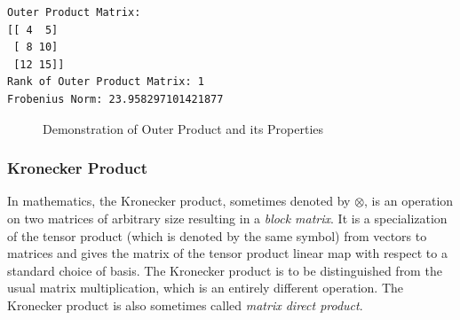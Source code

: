 \documentclass[
  letterpaper,
  DIV=11,
  numbers=noendperiod]{scrreprt}
\theoremstyle{plain}
\theoremstyle{definition}
\theoremstyle{remark}
\begin{document}
\begin{verbatim}
Outer Product Matrix:
[[ 4  5]
 [ 8 10]
 [12 15]]
Rank of Outer Product Matrix: 1
Frobenius Norm: 23.958297101421877
\end{verbatim}

\begin{figure}[H]


\caption{\label{fig-op}Demonstration of Outer Product and its
Properties}

\end{figure}%

\subsubsection{Kronecker Product}\label{kronecker-product}

In mathematics, the Kronecker product, sometimes denoted by \(\otimes\),
is an operation on two matrices of arbitrary size resulting in a
\emph{block matrix}. It is a specialization of the tensor product (which
is denoted by the same symbol) from vectors to matrices and gives the
matrix of the tensor product linear map with respect to a standard
choice of basis. The Kronecker product is to be distinguished from the
usual matrix multiplication, which is an entirely different operation.
The Kronecker product is also sometimes called \emph{matrix direct
product}.
\end{document}
